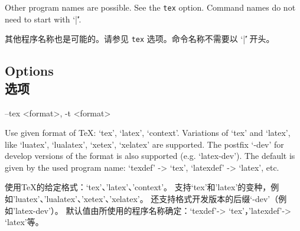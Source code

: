 \documentclass{article}
\newenvironment{options}{%
    \def\cstart{\begingroup\ttfamily\par\noindent\ignorespaces}%
    \def\csep{\endgroup\begingroup\list {}{}\item \relax}%
    \def\cend{\endlist\par\medskip\endgroup\cstart}%
    \cstart
}{%
    \endgroup
}
\begin{document}

Other program names are possible. See the \texttt{tex} option.  Command names do not need to start with `|\|'.

其他程序名称也是可能的。请参见 \texttt{tex} 选项。命令名称不需要以 `|\|' 开头。


\subsection*{Options\\选项}

\begin{parcolumns}[rulebetween=true,colwidths={2=.6\linewidth}]{2}
\end{parcolumns}


\par\medskip  

\begin{options}
--tex \MacroArgs<format>, -t \MacroArgs<format>    \csep Use given format of TeX: `tex', `latex', `context'.
Variations of `tex' and `latex', like `luatex', `lualatex', `xetex', `xelatex' are supported.
The postfix `-dev' for develop versions of the format is also supported (e.g. `latex-dev').
The default is given by the used program name: `texdef' -> `tex', `latexdef' -> `latex', etc.%

使用TeX的给定格式：`tex'、'latex'、'context'。
支持`tex'和'latex'的变种，例如'luatex'、'lualatex'、'xetex'、'xelatex'。
还支持格式开发版本的后缀`-dev'（例如'latex-dev'）。
默认值由所使用的程序名称确定：`texdef'-> `tex'，'latexdef'-> `latex'等。
\cend
\end{options}


\end{document}
